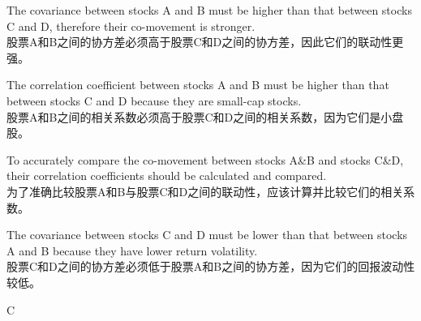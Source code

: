 \documentclass{article}
\begin{document}
\begin{choices}
    \item The covariance between stocks A and B must be higher than that between stocks C and D, therefore their co-movement is stronger.\\
    股票A和B之间的协方差必须高于股票C和D之间的协方差，因此它们的联动性更强。
    \item The correlation coefficient between stocks A and B must be higher than that between stocks C and D because they are small-cap stocks.\\
    股票A和B之间的相关系数必须高于股票C和D之间的相关系数，因为它们是小盘股。
    \item To accurately compare the co-movement between stocks A\&B and stocks C\&D, their correlation coefficients should be calculated and compared.\\
    为了准确比较股票A和B与股票C和D之间的联动性，应该计算并比较它们的相关系数。
    \item The covariance between stocks C and D must be lower than that between stocks A and B because they have lower return volatility.\\
    股票C和D之间的协方差必须低于股票A和B之间的协方差，因为它们的回报波动性较低。
\end{choices}

\begin{correctanswer}
    C
\end{correctanswer}
\end{document}

